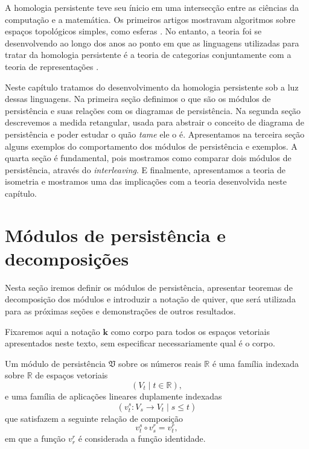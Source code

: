 A homologia persistente teve seu ínicio em uma intersecção entre as ciências da computação 
e a matemática. Os primeiros artigos mostravam algoritmos sobre espaços topológicos simples,
como esferas \cite{Edelsbrunner2000}. No entanto, a teoria foi se desenvolvendo 
ao longo dos anos ao ponto em que as linguagens utilizadas para tratar da homologia persistente 
é a teoria de categorias conjuntamente com a teoria de representações \cite{Chazal2016}.

Neste capítulo tratamos do desenvolvimento da homologia persistente sob a luz dessas linguagens. 
Na primeira seção definimos o que são os módulos de persistência e suas relações com os diagramas de 
persistência. Na segunda seção descrevemos a medida retangular, usada para abstrair o conceito 
de diagrama de persistência e poder estudar o quão \textit{tame} ele o é. Apresentamos na terceira seção
alguns exemplos do comportamento dos módulos de persistência e exemplos. A quarta seção é fundamental,
pois mostramos como comparar dois módulos de persistência, através do \textit{interleaving}. E finalmente,
apresentamos a teoria de isometria e mostramos uma das implicações com a teoria desenvolvida neste capítulo. 

\section{Módulos de persistência e decomposições}
Nesta seção iremos definir os módulos de persistência, apresentar teoremas de decomposição dos módulos 
e introduzir a notação de quiver, que será utilizada para as próximas seções e demonstrações de 
outros resultados. 

Fixaremos aqui a notação $\mathbf{k}$ como corpo para todos os espaços vetoriais apresentados neste texto, 
sem especificar necessariamente qual é o corpo. 

\begin{defi}
    Um módulo de persistência $\mathfrak{V}$ sobre os números reais $\mathbb{R}$ é uma família indexada 
    sobre $\mathbb{R}$ de espaços vetoriais 
    \begin{equation*}
        (V_t \mid t \in \mathbb{R}), 
    \end{equation*} 
    e uma família de aplicações lineares duplamente indexadas
    \begin{equation*}
        (v_t^s \colon V_s \to V_t \mid s \leq t) 
    \end{equation*}
    que satisfazem a seguinte relação de composição
    \begin{equation*}
        v_t^s \circ v_s^r = v_t^r,
    \end{equation*} 
    em que a função $v^r_r$ é considerada a função identidade. 
\end{defi}

